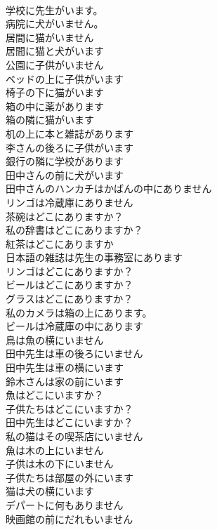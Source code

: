 \documentclass[8pt]{extreport}
\begin{document}
\begin{CJK}{UTF8}{min}
\\	学校に先生がいます。	
\\	病院に犬がいません。	
\\	居間に猫がいません	
\\	居間に猫と犬がいます	
\\	公園に子供がいません	
\\	ベッドの上に子供がいます	
\\	椅子の下に猫がいます	
\\	箱の中に薬があります	
\\	箱の隣に猫がいます	
\\	机の上に本と雑誌があります	
\\	李さんの後ろに子供がいます	
\\	銀行の隣に学校があります	
\\	田中さんの前に犬がいます	
\\	田中さんのハンカチはかばんの中にありません	
\\	リンゴは冷蔵庫にありません	
\\	茶碗はどこにありますか？	
\\	私の辞書はどこにありますか？	
\\	紅茶はどこにありますか	
\\	日本語の雑誌は先生の事務室にあります	
\\	リンゴはどこにありますか？	
\\	ビールはどこにありますか？	
\\	グラスはどこにありますか？	
\\	私のカメラは箱の上にあります。	
\\	ビールは冷蔵庫の中にあります	
\\	鳥は魚の横にいません	
\\	田中先生は車の後ろにいません	
\\	田中先生は車の横にいます	
\\	鈴木さんは家の前にいます	
\\	魚はどこにいますか？	
\\	子供たちはどこにいますか？	
\\	田中先生はどこにいますか？	
\\	私の猫はその喫茶店にいません	
\\	魚は木の上にいません	
\\	子供は木の下にいません	
\\	子供たちは部屋の外にいます	
\\	猫は犬の横にいます	
\\	デパートに何もありません	
\\	映画館の前にだれもいません	

\end{CJK}
\end{document}
